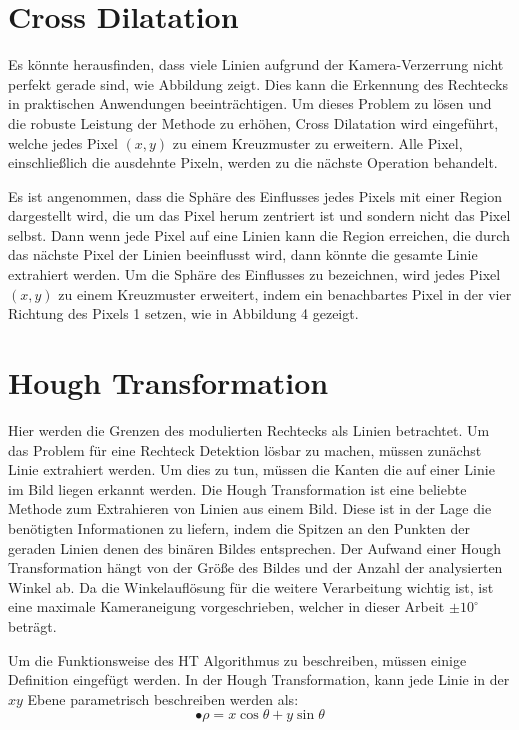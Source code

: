 \section{Cross Dilatation}

Es könnte herausfinden, dass viele Linien aufgrund der Kamera-Verzerrung nicht perfekt gerade sind, wie Abbildung zeigt. Dies kann die Erkennung des Rechtecks in praktischen Anwendungen beeinträchtigen. Um dieses Problem zu lösen und die robuste Leistung der Methode zu erhöhen, Cross Dilatation wird eingeführt, welche jedes Pixel $ (x,y) $ zu einem Kreuzmuster zu erweitern. Alle Pixel, einschließlich die ausdehnte Pixeln, werden zu die nächste Operation behandelt. 

Es ist angenommen, dass die Sphäre des Einflusses jedes Pixels mit einer Region dargestellt wird, die um das Pixel herum zentriert ist und sondern nicht das Pixel selbst. Dann wenn jede Pixel auf eine Linien kann die Region erreichen, die durch das nächste Pixel der Linien beeinflusst wird, dann könnte die gesamte Linie extrahiert werden. Um die Sphäre des Einflusses zu bezeichnen, wird jedes Pixel $ (x,y) $ zu einem Kreuzmuster erweitert, indem ein benachbartes Pixel in der vier Richtung des Pixels 1 setzen, wie in Abbildung 4 gezeigt.

\section{Hough Transformation}

Hier werden die Grenzen des modulierten Rechtecks als Linien betrachtet. Um das Problem für eine Rechteck Detektion lösbar zu machen, müssen zunächst Linie extrahiert werden. Um dies zu tun, müssen die Kanten die auf einer Linie im Bild liegen erkannt werden. Die Hough Transformation ist eine beliebte Methode zum Extrahieren von Linien aus einem Bild. Diese ist in der Lage die benötigten Informationen zu liefern, indem die Spitzen an den Punkten der geraden Linien denen des binären Bildes entsprechen. Der Aufwand einer Hough Transformation hängt von der Größe des Bildes und der Anzahl der analysierten Winkel ab. Da die Winkelauflösung für die weitere Verarbeitung wichtig ist, ist eine maximale Kameraneigung vorgeschrieben, welcher in dieser Arbeit $ \pm 10^{\circ} $ beträgt.

Um die Funktionsweise des HT Algorithmus zu beschreiben, müssen einige Definition eingefügt werden. In der Hough Transformation, kann jede Linie in der $ xy $ Ebene parametrisch beschreiben werden als:
\begin{equation}
•  \rho = x \cos \theta + y \sin \theta
 \label{gl:Anglekoordinate}
\end{equation} 

